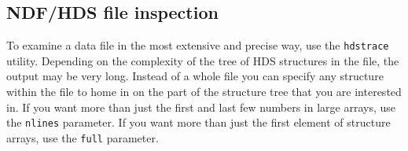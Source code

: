 \documentclass[11pt]{article}
\newcommand{\htmlref}[2]{#1}
\newcommand{\xref}[3]{#1}
\newcommand{\xlabel}[1]{}
\begin{document}
\subsection{\label{trace2}\xlabel{trace2}NDF/HDS file inspection}

   To examine a data file in the most extensive and precise way, use the
{\tt \xref{hdstrace}{sun102}{}}
   utility. Depending on the complexity of the tree of
\htmlref{HDS structures}{glosshds}
   in the file, the output may be very long. Instead of a whole file you
   can specify any structure within the file to home in on the part of
   the structure tree that you are interested in.
   If you want more than just the first and
   last few numbers in large arrays, use the {\tt nlines} parameter.
   If you want more than just the first element of structure arrays, use
   the {\tt full} parameter.
\end{document}
